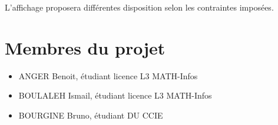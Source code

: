 L'affichage proposera différentes disposition selon les contraintes imposées.

\section{Membres du projet}

\begin{itemize}
    \item ANGER Benoit, étudiant licence L3 MATH-Infos
    \item BOULALEH Ismail, étudiant licence L3 MATH-Infos
    \item BOURGINE Bruno, étudiant DU CCIE
\end{itemize}

